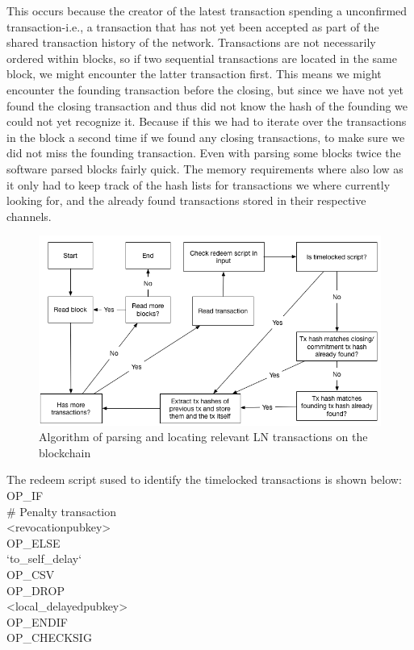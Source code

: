 This occurs because the creator of the latest transaction spending a unconfirmed transaction-i.e., a transaction that has not yet been accepted as part of the shared transaction history of the network. 
Transactions are not necessarily ordered within blocks, so if two sequential transactions are located in the same block, we might encounter the latter transaction first. This means we might encounter the founding transaction before the closing, but since we have not yet found the closing transaction and thus did not know the hash of the founding we could not yet recognize it. Because if this we had to iterate over the transactions in the block a second time if we found any closing transactions, to make sure we did not miss the founding transaction.
Even with parsing some blocks twice the software parsed blocks fairly quick. The memory requirements where also low as it only had to keep track of the hash lists for transactions we where currently looking for, and the already found transactions stored in their respective channels. 

\begin{figure}[h]
    \centering
    \includegraphics[width=12cm]{figures/algo_v2.png}
    \caption{Algorithm of parsing and locating relevant LN transactions on the blockchain}
    \label{fig:algo}
\end{figure}


The redeem script sused to identify the timelocked transactions is shown below: \cite{bolt3}
\\

\noindent OP\_IF \\
\indent   # Penalty transaction \\
\indent    <revocationpubkey> \\
OP\_ELSE\\
\indent    `to\_self\_delay`\\
\indent    OP\_CSV\\
\indent    OP\_DROP\\
\indent    <local\_delayedpubkey>\\
OP\_ENDIF\\
OP\_CHECKSIG\\

